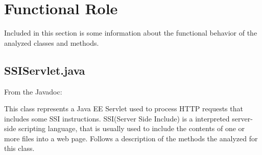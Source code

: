 \documentclass[11pt,titlepage]{article} %
\begin{document}
\newpage


\section{Functional Role}
  Included in this section is some information about the functional behavior of the analyzed classes and methods.\newline

\subsection{SSIServlet.java}

  From the Javadoc:
  
  

  \noindent This class represents a Java EE Servlet used to process HTTP requests that includes some SSI instructions.\newline
  SSI(Server Side Include) is a interpreted server-side scripting language,
  that is usually used to include the contents of one or more files into a web page.\newline
  Follows a description of the methods the analyzed for this class.
\end{document}
